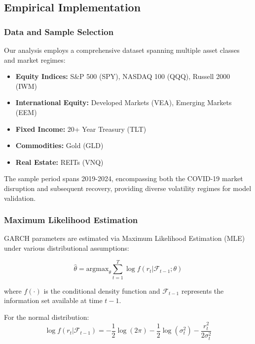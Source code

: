\documentclass[12pt,a4paper]{article}
\newcommand{\argmax}{\text{argmax}}
\begin{document}
\subsection{Empirical Implementation}

\subsubsection{Data and Sample Selection}

Our analysis employs a comprehensive dataset spanning multiple asset classes and market regimes:

\begin{itemize}
    \item \textbf{Equity Indices:} S\&P 500 (SPY), NASDAQ 100 (QQQ), Russell 2000 (IWM)
    \item \textbf{International Equity:} Developed Markets (VEA), Emerging Markets (EEM)
    \item \textbf{Fixed Income:} 20+ Year Treasury (TLT)
    \item \textbf{Commodities:} Gold (GLD)
    \item \textbf{Real Estate:} REITs (VNQ)
\end{itemize}

The sample period spans 2019-2024, encompassing both the COVID-19 market disruption and subsequent recovery, providing diverse volatility regimes for model validation.

\subsubsection{Maximum Likelihood Estimation}

GARCH parameters are estimated via Maximum Likelihood Estimation (MLE) under various distributional assumptions:

\begin{equation}
\hat{\theta} = \argmax_{\theta} \sum_{t=1}^{T} \log f(r_t | \mathcal{F}_{t-1}; \theta)
\end{equation}

where $f(\cdot)$ is the conditional density function and $\mathcal{F}_{t-1}$ represents the information set available at time $t-1$.

For the normal distribution:
\begin{equation}
\log f(r_t | \mathcal{F}_{t-1}) = -\frac{1}{2}\log(2\pi) - \frac{1}{2}\log(\sigma_t^2) - \frac{r_t^2}{2\sigma_t^2}
\end{equation}
\end{document}
